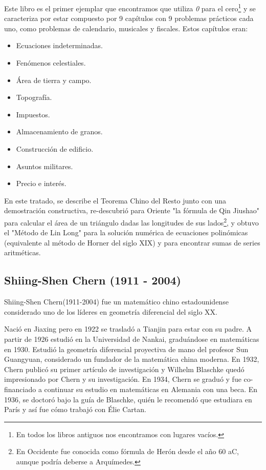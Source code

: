 \documentclass[a4paper, 11pt]{article}
\begin{document}
		Este libro es el primer ejemplar que encontramos que utiliza \textit{0} para el cero\footnote{En todos los libros
		antiguos nos encontramos con lugares vacíos.} y se caracteriza por estar compuesto por 9 capítulos con 9 problemas
		prácticos cada uno, como problemas de calendario, musicales y fiscales. Estos capítulos eran:
		\begin{itemize}
			\item Ecuaciones indeterminadas.
			\item Fenómenos celestiales.
			\item Área de tierra y campo.
			\item Topografía.
			\item Impuestos.
			\item Almacenamiento de granos.
			\item Construcción de edificio.
			\item Asuntos militares.
			\item Precio e interés.
		\end{itemize}
		
		En este tratado, se describe el Teorema Chino del Resto junto con una demostración constructiva, re-descubrió
		para Oriente "la fórmula de Qin Jiushao" para calcular el área de un triángulo dadas las longitudes de sus
		lados\footnote{En Occidente fue conocida como fórmula de Herón desde el año 60 aC, aunque podría deberse a
		Arquímedes.}, y obtuvo el "Método de Lin Long" para la solución numérica de ecuaciones polinómicas (equivalente
		al método de Horner del siglo XIX) y para encontrar sumas de series aritméticas.
	
	\subsection{Shiing-Shen Chern (1911 - 2004)}
		Shiing-Shen Chern(1911-2004) fue un matemático chino estadounidense considerado uno de los líderes en geometría
		diferencial del siglo XX.
		
		Nació en Jiaxing pero en 1922 se trasladó a Tianjin para estar con su padre. A partir de 1926 estudió en la
		Universidad de Nankai, graduándose en matemáticas en 1930. Estudió la geometría diferencial proyectiva de mano
		del profesor Sun Guangyuan, considerado un fundador de la matemática china moderna. En 1932, Chern publicó su
		primer artículo de investigación y Wilhelm Blaschke quedó impresionado por Chern y su investigación. En 1934,
		Chern se graduó y fue co-financiado a continuar su estudio en matemáticas en Alemania con una beca. En 1936, se
		doctoró bajo la guía de Blaschke, quién le recomendó que estudiara en París y así fue cómo trabajó con Élie Cartan.
		
\end{document}
